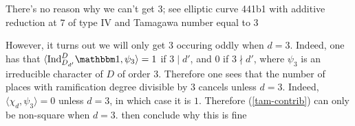 \begin{rem}
   There's no reason why we can't get 3; see elliptic curve 441b1 with additive reduction at $7$ of type IV and Tamagawa number equal to $3$
\end{rem}

However, it turns out we will only get $3$ occuring oddly when $d = 3$. Indeed, one has that $\langle \Ind_{D_{d'}}^D \trivial, \psi_3 \rangle = 1$ if $3 \mid d'$, and $0$ if $3 \nmid d'$, where $\psi_3$ is an irreducible character of $D$ of order $3$. Therefore one sees that the number of places with ramification degree divisible by $3$ cancels unless $d = 3$. Indeed, $\langle \chi_d , \psi_3 \rangle = 0$ unless $d = 3$, 
in which case it is $1$. Therefore (\ref{tam-contrib}) can only be non-square when $d = 3$. {\color{red} then conclude why this is fine}
